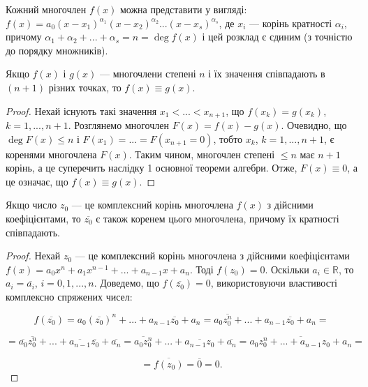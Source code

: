 \begin{corollary}
	Кожний многочлен $f(x)$ можна представити у вигляді:
	$f(x) = a_0(x-x_1)^{\alpha_1}(x-x_2)^{\alpha_2}...(x-x_s)^{\alpha_s}$,
	де $x_i$ --- корінь кратності $\alpha_i$, причому $\alpha_1 + \alpha_2 + ... + \alpha_s = n = \deg f(x)$ і цей розклад
	є єдиним (з точністю до порядку множників).
\end{corollary}

\begin{corollary}
	Якщо $f(x)$ і $g(x)$ --- многочлени степені $n$ і їх значення
	співпадають в $(n+1)$ різних точках, то $f(x) \equiv g(x)$.
\end{corollary}
\begin{proof}
	Нехай існують такі значення $x_1 < ... < x_{n+1}$, що $f(x_k) = g(x_k)$,
	$k = 1, ..., n+1$. Розглянемо многочлен $F(x) = f(x) - g(x)$. Очевидно, що
	$\deg F(x) \leqslant n$ і $F(x_1) = ... = F(x_{n+1} = 0)$, тобто $x_k$, $k = 1, ..., n+1$, є коренями
	многочлена $F(x)$. Таким чином, многочлен степені $\leqslant n$ має $n+1$ корінь, а це
	суперечить наслідку 1 основної теореми алгебри. Отже, $F(x) \equiv 0$, а це означає, що
	$f(x) \equiv g(x)$.
\end{proof}

\begin{corollary}
	Якщо число $z_0$ --- це комплексний корінь многочлена $f(x)$ з
	дійсними коефіцієнтами, то $\overline{z_0}$ є також коренем цього многочлена, причому їх
	кратності співпадають. 
\end{corollary}
\begin{proof}
	Нехай $z_0$ --- це комплексний корінь многочлена з дійсними
	коефіцієнтами $f(x) = a_0x^n + a_1x^{n-1} + ... + a_{n-1}x + a_n$. Тоді $f(z_0) = 0$. Оскільки
	$a_i \in \mathbb{R}$, то $a_i = \overline{a_i}$, $i = 0, 1, ..., n$. Доведемо,
	що $f(\overline{z_0}) = 0$, використовуючи
	властивості комплексно спряжених чисел:
	
	$$f(\overline{z_0}) = a_0(\overline{z_0})^n + ... + a_{n-1}\overline{z_0} + a_n = a_0\overline{z_0^n} + ... + a_{n-1}\overline{z_0} + a_n =$$
	
	$$= \overline{a_0}\overline{z_0^n} + ... + \overline{a_{n-1}}\overline{z_0} + \overline{a_n} = \overline{a_0 z_0^n} + ... + \overline{a_{n-1}z_0} + \overline{a_n} = \overline{a_0z_0^n + ... + a_{n-1}z_0 + a_n} =$$
	
	$$= \overline{f(z_0)} = \overline{0} = 0.$$
\end{proof}

